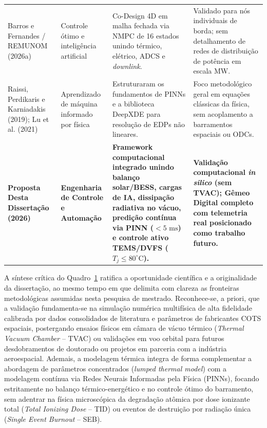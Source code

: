 \begin{table}[!htbp]
\begin{tabularx}{\textwidth}{p{3.0cm} p{2.9cm} X p{3.4cm}}
\addlinespace
Barros e Fernandes / REMUNOM (2026a) & Controle ótimo e inteligência artificial & Co-Design 4D em malha fechada via NMPC de 16 estados unindo térmico, elétrico, ADCS e \textit{downlink}. & Validado para nós individuais de borda; sem detalhamento de redes de distribuição de potência em escala MW. \\
\addlinespace
Raissi, Perdikaris e Karniadakis (2019); Lu et al. (2021) & Aprendizado de máquina informado por física & Estruturaram os fundamentos de PINNs e a biblioteca DeepXDE para resolução de EDPs não lineares. & Foco metodológico geral em equações clássicas da física, sem acoplamento a barramentos espaciais ou ODCs. \\
\midrule
\textbf{Proposta Desta Dissertação (2026)} & \textbf{Engenharia de Controle e Automação} & \textbf{Framework computacional integrado unindo balanço solar/BESS, cargas de IA, dissipação radiativa no vácuo, predição contínua via PINN ($<5\text{ ms}$) e controle ativo TEMS/DVFS ($T_j \le 80^\circ\text{C}$).} & \textbf{Validação computacional \textit{in silico} (sem TVAC); Gêmeo Digital completo com telemetria real posicionado como trabalho futuro.} \\
\bottomrule
\end{tabularx}
\label{tab:estado_arte}
\end{table}

A síntese crítica do Quadro~\ref{tab:estado_arte} ratifica a oportunidade científica e a originalidade da dissertação, ao mesmo tempo em que delimita com clareza as fronteiras metodológicas assumidas nesta pesquisa de mestrado. Reconhece-se, a priori, que a validação fundamenta-se na simulação numérica multifísica de alta fidelidade calibrada por dados consolidados de literatura e parâmetros de fabricantes COTS espaciais, postergando ensaios físicos em câmara de vácuo térmico (\textit{Thermal Vacuum Chamber} -- TVAC) ou validações em voo orbital para futuros desdobramentos de doutorado ou projetos em parceria com a indústria aeroespacial. Ademais, a modelagem térmica integra de forma complementar a abordagem de parâmetros concentrados (\textit{lumped thermal model}) com a modelagem contínua via Redes Neurais Informadas pela Física (PINNs), focando estritamente no balanço térmico-energético e no controle ótimo do barramento, sem adentrar na física microscópica da degradação atômica por dose ionizante total (\textit{Total Ionizing Dose} -- TID) ou eventos de destruição por radiação única (\textit{Single Event Burnout} -- SEB).